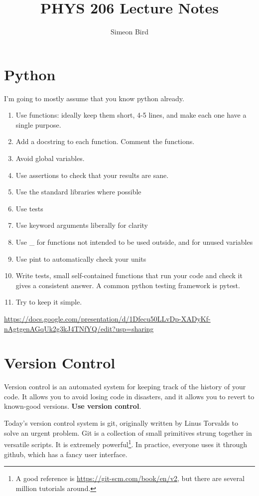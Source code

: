 \documentclass[12pt]{article}
\begin{document}
\title{PHYS 206 Lecture Notes}
\author{Simeon Bird}
\date{}
\maketitle

\section{Python}

I'm going to mostly assume that you know python already.

\begin{enumerate}
 \item Use functions: ideally keep them short, 4-5 lines, and make each one have a single purpose.
 \item Add a docstring to each function. Comment the functions.
 \item Avoid global variables.
 \item Use assertions to check that your results are sane.
 \item Use the standard libraries where possible
 \item Use tests
 \item Use keyword arguments liberally for clarity
 \item Use \_ for functions not intended to be used outside, and for unused variables
 \item Use pint to automatically check your units
 \item Write tests, small self-contained functions that run your code and check it gives a consistent answer. A common python testing framework is pytest.
 \item Try to keep it simple.
\end{enumerate}

\url{https://docs.google.com/presentation/d/1Dfecu50LLvDp-XADyKf-nAgtgenAGqUk2g3kJ4TNfYQ/edit?usp=sharing}

\section{Version Control}

Version control is an automated system for keeping track of the history of your code. It allows you to avoid losing code in disasters, and it allows you to revert to known-good versions. \textbf{Use version control}.

Today's version control system is git, originally written by Linus Torvalds to solve an urgent problem. Git is a collection of small primitives strung together in versatile scripts. It is extremely powerful\footnote{A good reference is \url{https://git-scm.com/book/en/v2}, but there are several million tutorials around.}. In practice, everyone uses it through github, which has a fancy user interface.
\end{document}
